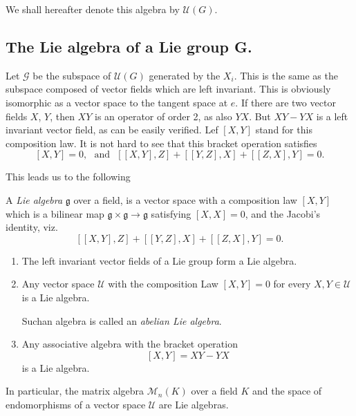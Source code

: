 We shall hereafter denote this algebra by $\mathcal{U}(G)$. 

\subsection{The Lie algebra of a Lie group
  G.}\label{chap2-sec2.6}%

Let $\mathscr{G}$ be the subspace of $\mathcal{U}(G)$ generated by the
$X_i$. This is the same as the subspace composed of vector fields
which are left invariant. This is obviously isomorphic as a vector space
to the tangent space at $e$. If there are two vector fields $X$, $Y$,
then $XY$ is an operator of order 2, as also $YX$. But $XY-YX$ is a
left invariant vector field, as can be easily verified. Lef $[X,Y]$
stand for this composition law. It is not hard to see that this
bracket operation satisfies 
$$
[X,Y]=0,\text{~  and~  } [[X,Y],Z]+[[Y,Z],X]+[[Z,X],Y]=0.
$$

This leads us to the following

\begin{defi*}%
A {\em Lie algebra} $\mathfrak{g}$ over a field, is a vector space
with a composition law $[X,Y]$ which is a bilinear map
$\mathfrak{g}\times \mathfrak{g} \to \mathfrak{g}$ satisfying
$[X,X]=0$, and the Jacobi's identity, viz.  
$$
[[X, Y],Z] + [[Y, Z], X] + [[Z, X],Y]=0.
$$
\end{defi*}

\begin{examples*}
\begin{enumerate}
\renewcommand{\labelenumi}{(\theenumi)}
\item The left invariant vector fields of a Lie group form a Lie algebra.

\item Any vector space $\mathcal{U}$ with the composition Law $[X,
  Y]=0$ for every $X, Y \in \mathcal{U}$ is a Lie algebra. 

Such\pageoriginale an algebra is called an \textit{abelian Lie algebra}.

\item Any associative algebra with the bracket operation 
$$
[X, Y]=XY-YX
$$
is a Lie algebra.
\end{enumerate}
\end{examples*}

In particular, the matrix algebra  $\mathscr{M}_n(K)$ over a field $K$
and the space of endomorphisms of a vector space $\mathcal{U}$ are Lie
algebras. 

